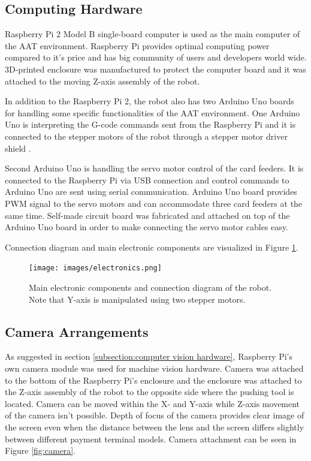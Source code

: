 \subsection{Computing Hardware}
\label{subsection:Computing hardware}

Raspberry Pi 2 Model B single-board computer is used as the main computer of the AAT environment. Raspberry Pi provides optimal computing power compared to it's price and has big community of users and developers world wide. 3D-printed enclosure was manufactured to protect the computer board and it was attached to the moving Z-axis assembly of the robot.

In addition to the Raspberry Pi 2, the robot also has two Arduino Uno boards for handling some specific functionalities of the AAT environment. One Arduino Uno is interpreting the G-code commands sent from the Raspberry Pi and it is connected to the stepper motors of the robot through a stepper motor driver shield \citep{grbl_shield}.

Second Arduino Uno is handling the servo motor control of the card feeders. It is connected to the Raspberry Pi via USB connection and control commands to Arduino Uno are sent using serial communication. Arduino Uno board provides PWM signal to the servo motors and can accommodate three card feeders at the same time. Self-made circuit board was fabricated and attached on top of the Arduino Uno board in order to make connecting the servo motor cables easy.

Connection diagram and main electronic components are visualized in Figure \ref{fig:electronics}.

\begin{figure}[ht]
  \begin{center}
    \texttt{[image: images/electronics.png]}
    \caption{Main electronic components and connection diagram of the robot. Note that Y-axis is manipulated using two stepper motors.}
    \label{fig:electronics}
  \end{center}
\end{figure}
\FloatBarrier

\subsection{Camera Arrangements}
\label{subsection:Camera Arrangements}

As suggested in section \ref{subsection:computer vision hardware}, Raspberry Pi's own camera module was used for machine vision hardware. Camera was attached to the bottom of the Raspberry Pi's enclosure and the enclosure was attached to the Z-axis assembly of the robot to the opposite side where the pushing tool is located. Camera can be moved within the X- and Y-axis while Z-axis movement of the camera isn't possible. Depth of focus of the camera provides clear image of the screen even when the distance between the lens and the screen differs slightly between different payment terminal models. Camera attachment can be seen in Figure \ref{fig:camera}.

